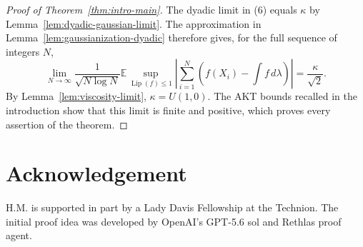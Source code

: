 \documentclass{smfart}
\theoremstyle{definition}
\newcommand{\1}{\mathbf 1}
\newcommand{\Lip}{\operatorname{Lip}}
\begin{document}
\begin{samepage}
\begin{proof}[Proof of Theorem~\ref{thm:intro-main}]
The dyadic limit in (6) equals $\kappa$ by
Lemma~\ref{lem:dyadic-gaussian-limit}.  The approximation in
Lemma~\ref{lem:gaussianization-dyadic} therefore gives, for the full
sequence of integers $N$,
\begin{equation*}
\lim_ {N\to\infty}\frac1{\sqrt{N\log N}}
\mathbb E\sup_ {\Lip(f)\leq1}
\left|\sum_ {i=1}^N\left(f(X_ i)-\int f\,d\lambda\right)\right|
=\frac\kappa{\sqrt2}.
\end{equation*}
By Lemma~\ref{lem:viscosity-limit}, $\kappa=U(1,0)$.  The AKT bounds
recalled in the introduction show that this limit is finite and positive,
which proves every assertion of the theorem.

\end{proof}

\end{samepage}

\section*{Acknowledgement}

H.M. is supported in part by a Lady Davis Fellowship at the Technion.
The initial proof idea was developed by OpenAI's GPT-5.6 sol and
Rethlas proof agent.

\begingroup
\raggedright


\endgroup
\end{document}
